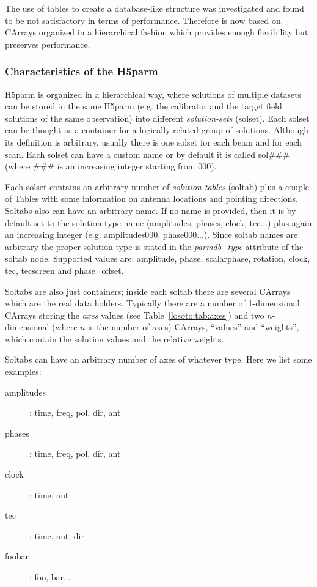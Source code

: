 \documentclass[]{article}
\begin{document}
The use of tables to create a database-like structure was investigated and found to be not satisfactory in terms of performance. Therefore \losoto{} is now based on CArrays organized in a hierarchical fashion which provides enough flexibility but preserves performance.

\subsubsection{Characteristics of the H5parm}
\label{losoto:characteristics_h5parm}

H5parm is organized in a hierarchical way, where solutions of multiple datasets can be stored in the same H5parm (e.g. the calibrator and the target field solutions of the same observation) into different \textit{solution-sets} (solset). Each solset can be thought as a container for a logically related group of solutions. Although its definition is arbitrary, usually there is one solset for each beam and for each scan. Each solset can have a custom name or by default it is called sol\#\#\# (where \#\#\# is an increasing integer starting from 000).

Each solset contains an arbitrary number of \textit{solution-tables} (soltab) plus a couple of Tables with some information on antenna locations and pointing directions. Soltabs also can have an arbitrary name. If no name is provided, then it is by default set to the solution-type name (amplitudes, phases, clock, tec...) plus again an increasing integer (e.g. amplitudes000, phase000...). Since soltab names are arbitrary the proper solution-type is stated in the \textit{parmdb\_type} attribute of the soltab node. Supported values are: amplitude, phase, scalarphase, rotation, clock, tec, tecscreen and phase\_offset.

Soltabs are also just containers; inside each soltab there are several CArrays which are the real data holders. Typically there are a number of 1-dimensional CArrays storing the \textit{axes} values (see Table~\ref{losoto:tab:axes}) and two $n$-dimensional (where $n$ is the number of axes) CArrays, ``values'' and ``weights'', which contain the solution values and the relative weights.

Soltabs can have an arbitrary number of axes of whatever type. Here we list some examples:
\begin{description}
 \item[amplitudes]: time, freq, pol, dir, ant
 \item[phases]: time, freq, pol, dir, ant
 \item[clock]: time, ant
 \item[tec]: time, ant, dir
 \item[foobar]: foo, bar...
\end{description}
\end{document}
